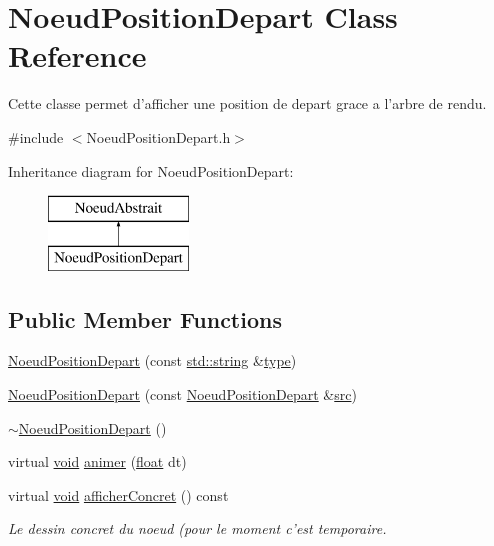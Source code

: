 \hypertarget{class_noeud_position_depart}{\section{Noeud\-Position\-Depart Class Reference}
\label{class_noeud_position_depart}
}


Cette classe permet d'afficher une position de depart grace a l'arbre de rendu.  




{\ttfamily \#include $<$Noeud\-Position\-Depart.\-h$>$}

Inheritance diagram for Noeud\-Position\-Depart\-:\begin{figure}[H]
\begin{center}
\leavevmode
\includegraphics[height=2.000000cm]{class_noeud_position_depart}
\end{center}
\end{figure}
\subsection*{Public Member Functions}
\begin{DoxyCompactItemize}
\item 
\hyperlink{class_noeud_position_depart_a236d93969d761048212958011d3d6973}{Noeud\-Position\-Depart} (const \hyperlink{glew_8h_ae84541b4f3d8e1ea24ec0f466a8c568b}{std\-::string} \&\hyperlink{fmod_8h_a5338b9cb3874378d7e5adfbe80a8a381}{type})
\item 
\hyperlink{class_noeud_position_depart_a2a1e3c7807399c8451a6ec4215456205}{Noeud\-Position\-Depart} (const \hyperlink{class_noeud_position_depart}{Noeud\-Position\-Depart} \&\hyperlink{glew_8h_a72e0fdf0f845ded60b1fada9e9195cd7}{src})
\item 
\hyperlink{class_noeud_position_depart_a1b301b686153b5df3e9e5789a4dc760d}{$\sim$\-Noeud\-Position\-Depart} ()
\item 
virtual \hyperlink{wglew_8h_aeea6e3dfae3acf232096f57d2d57f084}{void} \hyperlink{class_noeud_position_depart_aa87b39fbe5ae4f44519645a58c20cec4}{animer} (\hyperlink{fmod_8h_aeb841aa4b4b5f444b5d739d865b420af}{float} dt)
\item 
virtual \hyperlink{wglew_8h_aeea6e3dfae3acf232096f57d2d57f084}{void} \hyperlink{class_noeud_position_depart_a39b82bb20a515295048655572e58b9ab}{afficher\-Concret} () const 
\begin{DoxyCompactList}\small\item\em Le dessin concret du noeud (pour le moment c'est temporaire. \end{DoxyCompactList}\end{DoxyCompactItemize}
